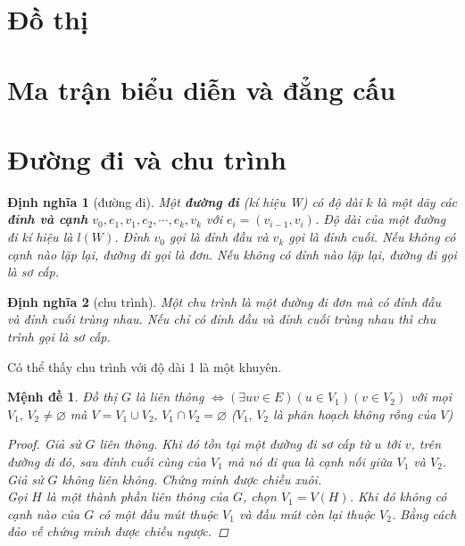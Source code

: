 \documentclass[14pt]{extarticle}
\newtheorem{definition}{Định nghĩa}[section]
\newtheorem{proposition}{Mệnh đề}[section]
\begin{document}


\section{Đồ thị}


\section{Ma trận biểu diễn và đẳng cấu}


\section{Đường đi và chu trình}
\begin{definition}[đường đi]
	\label{def:duong-di}
	Một \textbf{đường đi} (kí hiệu W) có độ dài $k$ là một dãy các \textbf{đỉnh và cạnh} $v_0, e_1, v_1, e_2,\cdots,e_k,v_k$ với $e_i = (v_{i-1},v_i)$. Độ dài của một đường đi kí hiệu là $l(W)$. Đỉnh $v_0$ gọi là đỉnh đầu và $v_k$ gọi là đỉnh cuối. Nếu không có cạnh nào lặp lại, đường đi gọi là đơn. Nếu không có đỉnh nào lặp lại, đường đi gọi là sơ cấp.
\end{definition}
\begin{definition}[chu trình]
	\label{def:chu-trinh}
	 Một chu trình là một đường đi đơn mà có đỉnh đầu và đỉnh cuối trùng nhau. Nếu chỉ có đỉnh đầu và đỉnh cuối trùng nhau thì chu trình gọi là sơ cấp.
\end{definition}
Có thể thấy chu trình với độ dài 1 là một khuyên.
\begin{proposition}
	Đồ thị $G$ là liên thông $\iff ({\exists uv \in E})({ u\in V_1})({v \in V_2})$ với mọi $V_1,\,V_2 \ne \varnothing$ mà $V = V_1\cup V_2,\, V_1 \cap V_2 = \varnothing$ ($V_1,\,V_2$ là phân hoạch không rỗng của $V$)
	\begin{proof}
		Giả sử $G$ liên thông. Khi đó tồn tại một đường đi sơ cấp từ $u$ tới $v$, trên đường đi đó, sau đỉnh cuối cùng của $V_1$ mà nó đi qua là cạnh nối giữa $V_1$ và $V_2$. Giả sử $G$ không liên không. Chứng minh được chiều xuôi.\\
		Gọi $H$ là một thành phần liên thông của $G$, chọn $V_1 = V(H)$. Khi đó không có cạnh nào của $G$ có một đầu mút thuộc $V_1$ và đầu mút còn lại thuộc $V_2$. Bằng cách đảo vế chứng minh được chiều ngược.
	\end{proof}
\end{proposition}
\end{document}
